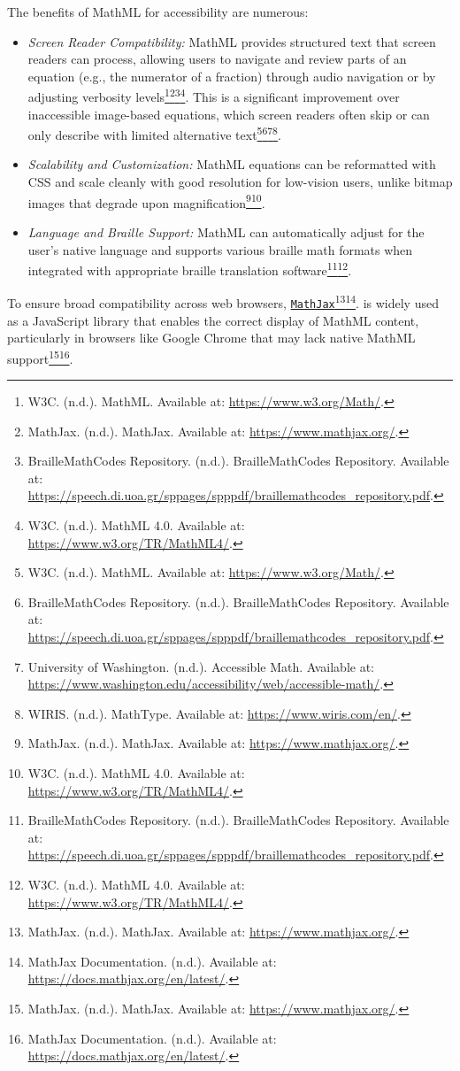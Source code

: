 The benefits of MathML for accessibility are numerous:
\begin{itemize}
    \item \emph{Screen Reader Compatibility:} MathML provides structured text that screen readers can process, allowing users to navigate and review parts of an equation (e.g., the numerator of a fraction) through audio navigation or by adjusting verbosity levels\footnote{W3C. (n.d.). MathML. Available at: \url{https://www.w3.org/Math/}.}\footnote{MathJax. (n.d.). MathJax. Available at: \url{https://www.mathjax.org/}.}\footnote{BrailleMathCodes Repository. (n.d.). BrailleMathCodes Repository. Available at: \url{https://speech.di.uoa.gr/sppages/spppdf/braillemathcodes_repository.pdf}.}\footnote{W3C. (n.d.). MathML 4.0. Available at: \url{https://www.w3.org/TR/MathML4/}.}. This is a significant improvement over inaccessible image-based equations, which screen readers often skip or can only describe with limited alternative text\footnote{W3C. (n.d.). MathML. Available at: \url{https://www.w3.org/Math/}.}\footnote{BrailleMathCodes Repository. (n.d.). BrailleMathCodes Repository. Available at: \url{https://speech.di.uoa.gr/sppages/spppdf/braillemathcodes_repository.pdf}.}\footnote{University of Washington. (n.d.). Accessible Math. Available at: \url{https://www.washington.edu/accessibility/web/accessible-math/}.}\footnote{WIRIS. (n.d.). MathType. Available at: \url{https://www.wiris.com/en/}.}.
    \item \emph{Scalability and Customization:} MathML equations can be reformatted with CSS and scale cleanly with good resolution for low-vision users, unlike bitmap images that degrade upon magnification\footnote{MathJax. (n.d.). MathJax. Available at: \url{https://www.mathjax.org/}.}\footnote{W3C. (n.d.). MathML 4.0. Available at: \url{https://www.w3.org/TR/MathML4/}.}.
    \item \emph{Language and Braille Support:} MathML can automatically adjust for the user's native language and supports various braille math formats when integrated with appropriate braille translation software\footnote{BrailleMathCodes Repository. (n.d.). BrailleMathCodes Repository. Available at: \url{https://speech.di.uoa.gr/sppages/spppdf/braillemathcodes_repository.pdf}.}\footnote{W3C. (n.d.). MathML 4.0. Available at: \url{https://www.w3.org/TR/MathML4/}.}.
\end{itemize}
To ensure broad compatibility across web browsers, \href{https://www.mathjax.org/}{\texttt{MathJax}}\footnote{MathJax. (n.d.). MathJax. Available at: \url{https://www.mathjax.org/}.}\footnote{MathJax Documentation. (n.d.). Available at: \url{https://docs.mathjax.org/en/latest/}.}. is widely used as a JavaScript library that enables the correct display of MathML content, particularly in browsers like Google Chrome that may lack native MathML support\footnote{MathJax. (n.d.). MathJax. Available at: \url{https://www.mathjax.org/}.}\footnote{MathJax Documentation. (n.d.). Available at: \url{https://docs.mathjax.org/en/latest/}.}.

